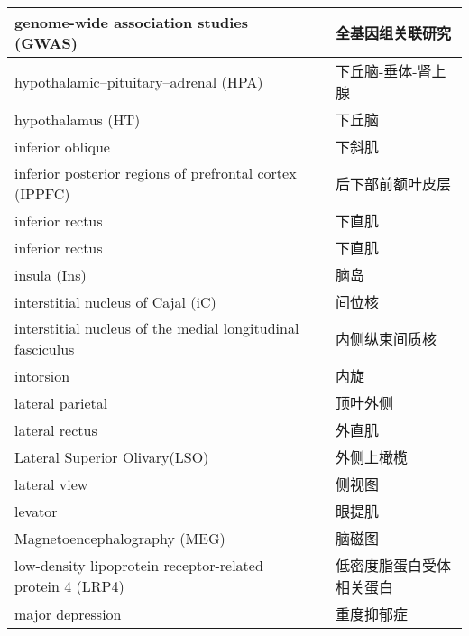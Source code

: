 \begin{longtable}{lll}
	\midrule
	genome-wide association studies (GWAS)     &&  全基因组关联研究  \\
	
	\midrule
	hypothalamic–pituitary–adrenal (HPA)     &&  下丘脑-垂体-肾上腺  \\
	
	\midrule
	hypothalamus (HT)     &&  下丘脑  \\
	
	\midrule
	inferior oblique   && 下斜肌  \\
	
	\midrule
	inferior posterior regions of prefrontal cortex (IPPFC)  && 后下部前额叶皮层  \\
	
	\midrule
	inferior rectus   && 下直肌  \\
	
	\midrule
	inferior rectus   && 下直肌  \\
	
	\midrule
	insula (Ins)   && 脑岛  \\
	
	\midrule
	interstitial nucleus of Cajal (iC)   && 间位核  \\
	
	\midrule
	interstitial nucleus of the medial longitudinal fasciculus   && 内侧纵束间质核  \\
	
	\midrule
	intorsion   && 内旋  \\
	
	\midrule
	lateral parietal   && 顶叶外侧  \\
	
	\midrule
	lateral rectus   && 外直肌  \\
	
	\midrule
	Lateral Superior Olivary(LSO)   && 外侧上橄榄  \\
	
	\midrule
	lateral view   && 侧视图  \\
	
	\midrule
	levator   && 眼提肌  \\
		
	\midrule
	Magnetoencephalography (MEG)   && 脑磁图  \\
	
	\midrule
	low-density lipoprotein receptor-related protein 4 (LRP4)   && 低密度脂蛋白受体相关蛋白  \\
	
	\midrule
	major depression   && 重度抑郁症  \\
	

\end{longtable}

